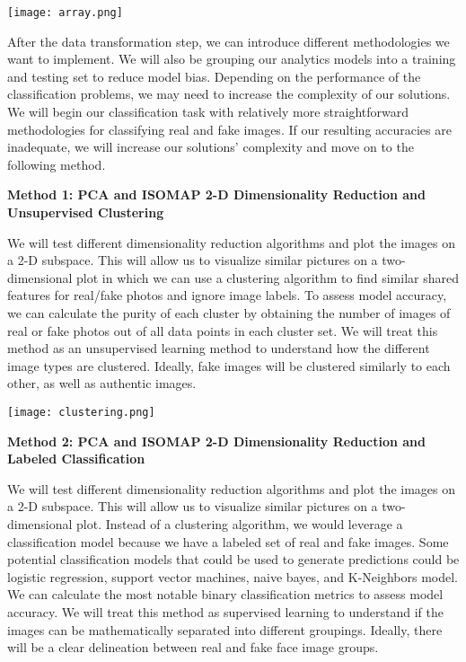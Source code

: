 \documentclass{article}
\begin{document}
\begin{titlepage}
\begin{itemize}
\begin{center}
\texttt{[image: array.png]}
\end{center}

    After the data transformation step, we can introduce different methodologies we want to implement. We will also be grouping our analytics models into a training and testing set to reduce model bias. Depending on the performance of the classification problems, we may need to increase the complexity of our solutions. We will begin our classification task with relatively more straightforward methodologies for classifying real and fake images. If our resulting accuracies are inadequate, we will increase our solutions' complexity and move on to the following method.

    \textbf{Method 1: PCA and ISOMAP 2-D Dimensionality Reduction and Unsupervised Clustering}

    We will test different dimensionality reduction algorithms and plot the images on a 2-D subspace. This will allow us to visualize similar pictures on a two-dimensional plot in which we can use a clustering algorithm to find similar shared features for real/fake photos and ignore image labels. To assess model accuracy, we can calculate the purity of each cluster by obtaining the number of images of real or fake photos out of all data points in each cluster set. We will treat this method as an unsupervised learning method to understand how the different image types are clustered. Ideally, fake images will be clustered similarly to each other, as well as authentic images.

\begin{center}
\texttt{[image: clustering.png]}
\end{center}


\newpage


    \textbf{Method 2: PCA and ISOMAP 2-D Dimensionality Reduction and Labeled Classification}

    We will test different dimensionality reduction algorithms and plot the images on a 2-D subspace. This will allow us to visualize similar pictures on a two-dimensional plot. Instead of a clustering algorithm, we would leverage a classification model because we have a labeled set of real and fake images. Some potential classification models that could be used to generate predictions could be logistic regression, support vector machines, naive bayes, and K-Neighbors model. We can calculate the most notable binary classification metrics to assess model accuracy. We will treat this method as supervised learning to understand if the images can be mathematically separated into different groupings. Ideally, there will be a clear delineation between real and fake face image groups.


\end{itemize}
\end{titlepage}
\end{document}
